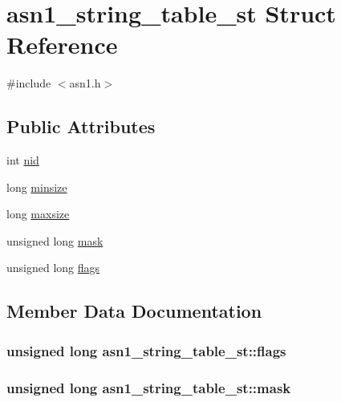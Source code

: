 \hypertarget{structasn1__string__table__st}{}\section{asn1\+\_\+string\+\_\+table\+\_\+st Struct Reference}
\label{structasn1__string__table__st}


{\ttfamily \#include $<$asn1.\+h$>$}

\subsection*{Public Attributes}
\begin{DoxyCompactItemize}
\item 
int \hyperlink{structasn1__string__table__st_afc0e790d52b34b5f3705214ee92fa207}{nid}
\item 
long \hyperlink{structasn1__string__table__st_a4428b94f772280133e146a55e2731610}{minsize}
\item 
long \hyperlink{structasn1__string__table__st_a8a4de03a35f1840e86f9aa8ba934a42f}{maxsize}
\item 
unsigned long \hyperlink{structasn1__string__table__st_a3dcff470ab384f991b68bbd9f2034d55}{mask}
\item 
unsigned long \hyperlink{structasn1__string__table__st_a37e4651359671ca1bd5b3f8013ca5ef4}{flags}
\end{DoxyCompactItemize}


\subsection{Member Data Documentation}
\subsubsection[{\texorpdfstring{flags}{flags}}]{\setlength{\rightskip}{0pt plus 5cm}unsigned long asn1\+\_\+string\+\_\+table\+\_\+st\+::flags}\hypertarget{structasn1__string__table__st_a37e4651359671ca1bd5b3f8013ca5ef4}{}\label{structasn1__string__table__st_a37e4651359671ca1bd5b3f8013ca5ef4}
\subsubsection[{\texorpdfstring{mask}{mask}}]{\setlength{\rightskip}{0pt plus 5cm}unsigned long asn1\+\_\+string\+\_\+table\+\_\+st\+::mask}\hypertarget{structasn1__string__table__st_a3dcff470ab384f991b68bbd9f2034d55}{}\label{structasn1__string__table__st_a3dcff470ab384f991b68bbd9f2034d55}
